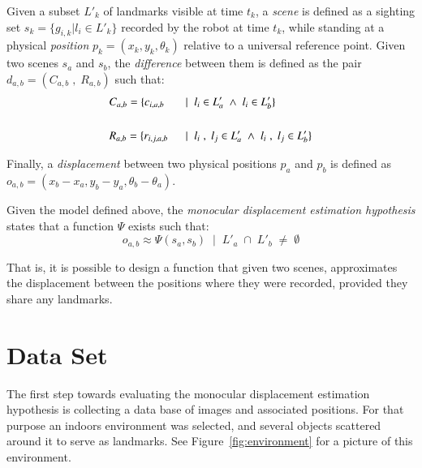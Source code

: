 \documentclass[twocolumn, 9pt]{jsproceedings}
\begin{document}
Given a subset \(L'_k\) of landmarks visible at time \(t_k\), a {\it scene} is defined as a sighting set \(s_k = \{g_{i,k} | l_i \in L'_k\}\) recorded by the robot at time \(t_k\), while standing at a physical {\it position} \(p_k = (x_k, y_k, \theta_k)\) relative to a universal reference point. Given two scenes \(s_a\) and \(s_b\), the {\it difference} between them is defined as the pair \(d_{a,b} = (C_{a,b} \; , \; R_{a,b})\) such that:
\begin{alignat}{2}
& C_{a,b} = \{c_{i,a,b} \;\;  && | \;\; l_i \in L'_a \; \land \; l_i \in L'_b \} \\
 \notag\\
& R_{a,b} = \{r_{i,j,a,b} \;\; && | \;\; l_i \; , \; l_j \in L'_a \; \land \; l_i \; , \; l_j \in L'_b \}
\end{alignat}

Finally, a {\it displacement} between two physical positions \(p_a\) and \(p_b\) is defined as \(o_{a,b} = (x_b - x_a, y_b - y_a, \theta_b - \theta_a)\).

Given the model defined above, the {\it monocular displacement estimation hypothesis} states that a function \(\Psi\) exists such that:
\begin{equation}
o_{a,b} \approx \Psi(s_a, s_b) \;\; | \;\; L'_a \; \cap \; L'_b \; \neq \; \emptyset
\end{equation}

That is, it is possible to design a function that given two scenes, approximates the displacement between the positions where they were recorded, provided they share any landmarks.

\section{Data Set}

The first step towards evaluating the monocular displacement estimation hypothesis is collecting a data base of images and associated positions. For that purpose an indoors environment was selected, and several objects scattered around it to serve as landmarks. See Figure~\ref{fig:environment} for a picture of this environment.
\end{document}
